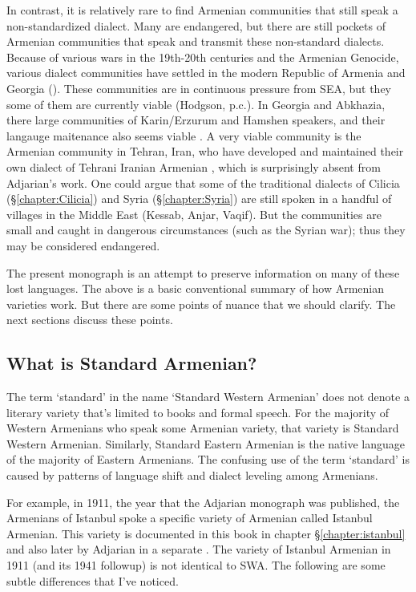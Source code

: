 In contrast, it is relatively rare to find Armenian communities that still speak a non-standardized dialect. Many are endangered, but there are still pockets of Armenian communities that speak and transmit these non-standard dialects.  Because of various wars in the 19th-20th centuries and the Armenian Genocide, various dialect communities have settled in the modern Republic of Armenia and Georgia (\citealt[\S2.2.2]{Hodgson-2019-DissRelativeClauseArmenianSyntax}). These communities are in continuous pressure from SEA, but they some of them are currently viable (Hodgson, p.c.). In Georgia and Abkhazia, there    large communities of Karin/Erzurum and Hamshen speakers, and their langauge maitenance also seems viable \citep{Bezrukov-2022-DissCaucasusMotionArmenian}.  A very viable community is the Armenian community in Tehran, Iran, who have developed and maintained their own dialect of Tehrani Iranian Armenian \citep{DolatianEtAl-prep-IranianGrammar}, which is surprisingly absent from Adjarian's work. One could argue that some of the traditional dialects of Cilicia (\S\ref{chapter:Cilicia}) and Syria (\S\ref{chapter:Syria}) are still spoken in a handful of villages in the Middle East (Kessab, Anjar, Vaqif). But the communities are small and caught in dangerous circumstances (such as the Syrian war); thus they may be considered endangered.

 The present monograph is an attempt to preserve information on many of these lost languages. The above is a basic conventional summary of how Armenian varieties work. But there are some points of nuance that we should clarify. The next sections discuss these points. 

 

\subsection{What is Standard Armenian?}\label{sec:HossepIntro:armenian:whatisstandard}
The term `standard' in the name `Standard Western Armenian' does not denote a literary variety that's limited to books and formal speech. For the majority of Western Armenians who speak some Armenian variety, that variety is Standard Western Armenian. Similarly, Standard Eastern Armenian is the native language of the majority of Eastern Armenians. The confusing use of the term `standard' is caused by patterns of language shift and dialect leveling among Armenians.

For example, in 1911, the year that the Adjarian monograph was published, the Armenians of Istanbul spoke a specific variety of Armenian called Istanbul Armenian. This variety is documented in this book in chapter \S\ref{chapter:istanbul} and also later by Adjarian in a separate \citep{Adjarian-1941-IstanbulDialect}. The variety of Istanbul Armenian in 1911 (and its 1941 followup) is not identical to SWA. The following are some subtle differences that I've noticed. 

